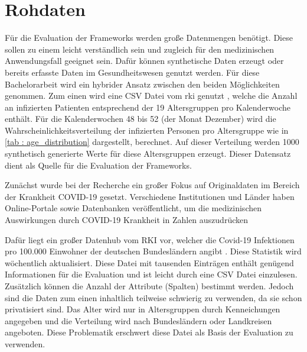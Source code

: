 \section{Rohdaten}
Für die Evaluation der Frameworks werden große Datenmengen benötigt. Diese sollen zu einem leicht verständlich sein und zugleich für den medizinischen Anwendungsfall geeignet sein. Dafür können synthetische Daten erzeugt oder bereits erfasste Daten im Gesundheitswesen genutzt werden. Für diese Bachelorarbeit wird ein hybrider Ansatz zwischen den beiden Möglichkeiten genommen. Zum einen wird eine CSV Datei vom \gls{rki} genutzt \parencite{RKIAltersverteilung}, welche die Anzahl an infizierten Patienten entsprechend der 19 Altersgruppen pro Kalenderwoche enthält. Für die Kalenderwochen 48 bis 52 (der Monat Dezember) wird die Wahrscheinlichkeitsverteilung der infizierten Personen pro Altersgruppe wie in \cref{tab : age_distribution} dargestellt, berechnet. Auf dieser Verteilung werden 1000 synthetisch generierte Werte für diese Altersgruppen erzeugt. Dieser Datensatz dient als Quelle für die Evaluation der Frameworks.

Zunächst wurde bei der Recherche ein großer Fokus auf Originaldaten im Bereich der Krankheit COVID-19 gesetzt. Verschiedene Institutionen und Länder haben Online-Portale sowie Datenbanken veröffentlicht, um die medizinischen Auswirkungen durch COVID-19 Krankheit in Zahlen auszudrücken

Dafür liegt ein großer Datenhub vom RKI vor, welcher die Covid-19 Infektionen pro 100.000 Einwohner der deutschen Bundesländern angibt \parencite{Datenhub}. Diese Statistik wird wöchentlich aktualisiert. Diese Datei mit tausenden Einträgen enthält genügend Informationen für die Evaluation und ist leicht durch eine CSV Datei einzulesen. Zusätzlich können die Anzahl der Attribute (Spalten) bestimmt werden. Jedoch sind die Daten zum einen inhaltlich teilweise schwierig zu verwenden, da sie schon privatisiert sind. Das Alter wird nur in Altersgruppen durch Kenneichungen angegeben und die Verteilung wird nach Bundesländern oder Landkreisen angeboten. Diese Problematik erschwert diese Datei als Basis der Evaluation zu verwenden.

